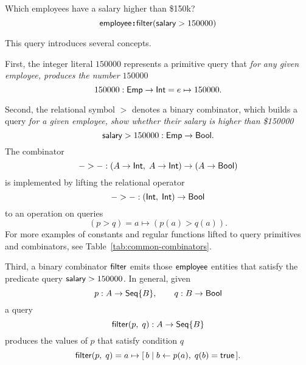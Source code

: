 \begin{demo}
    \label{ex:filter-by-salary}
    Which employees have a salary higher than \$150k?
    \begin{equation*}
        \mathsf{employee}\!\boldsymbol{:}\!\mathsf{filter}(\mathsf{salary}>150000)
    \end{equation*}
\end{demo}

This query introduces several concepts.

First, the integer literal $150000$ represents a primitive query that
\emph{for any given employee, produces the number $150000$}
\begin{equation*}
    150000 : \mathsf{Emp} \to \mathsf{Int} = e \mapsto 150000.
\end{equation*}

Second, the relational symbol ${>}$ denotes a binary combinator, which builds a
query \emph{for a given employee, show whether their salary is higher than
\$150000}
\begin{equation*}
    \mathsf{salary} > 150000 : \mathsf{Emp} \to \mathsf{Bool}.
\end{equation*}
The combinator
\begin{equation*}
    {-}>{-} : (A \to \mathsf{Int},\; A \to \mathsf{Int}) \to (A \to \mathsf{Bool})
\end{equation*}
is implemented by lifting the relational operator
\begin{equation*}
    {-}>{-} : (\mathsf{Int},\; \mathsf{Int}) \to \mathsf{Bool}
\end{equation*}
to an operation on queries
\begin{equation*}
    (p > q) = a \mapsto (p(a) > q(a)).
\end{equation*}
For more examples of constants and regular functions lifted to query primitives
and combinators, see Table~\ref{tab:common-combinators}.

Third, a binary combinator $\mathsf{filter}$ emits those $\mathsf{employee}$ entities that
satisfy the predicate query $\mathsf{salary} > 150000$.  In general, given
\begin{equation*}
    p : A \to \mathsf{Seq}{\left\{B\right\}}, \qquad q : B \to \mathsf{Bool}
\end{equation*}
a query
\begin{equation*}
    \mathsf{filter}(p,\; q) : A \to \mathsf{Seq}{\left\{B\right\}}
\end{equation*}
produces the values of $p$ that satisfy condition $q$
\begin{equation*}
    \mathsf{filter}(p,\; q) = a \mapsto [\,b \mid b \gets p(a),\; q(b)=\mathsf{true}\,].
\end{equation*}

